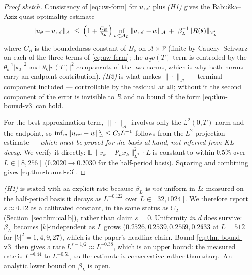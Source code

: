 \begin{proof}[Proof sketch]
Consistency of \eqref{eq:uw-form} for $u_{\rm ref}$ plus \emph{(H1)} gives the
Babu\v{s}ka--Aziz quasi-optimality estimate
\[
  \|u_\theta - u_{\rm ref}\|_{\mathcal{A}}
  \;\le\;
  \Bigl(1 + \tfrac{C_B}{\beta_L}\Bigr)
    \inf_{w \in \mathcal{A}_L} \|u_{\rm ref} - w\|_{\mathcal{A}}
  \;+\; \beta_L^{-1} \|R(\theta)\|_{\mathcal{V}_L'} ,
\]
where $C_B$ is the boundedness constant of $B_k$ on
$\mathcal{A} \times \mathcal{V}$ (finite by Cauchy--Schwarz on each of the three
terms of \eqref{eq:uw-form}; the $a_T v(T)$ term is controlled by the
$\theta_k^{-1}|a_T|^2$ and $\theta_k |v(T)|^2$ components of the two norms, which
is why both norms carry an endpoint contribution). \emph{(H2)} is what makes
$\|\cdot\|_{\mathcal{A}}$ --- terminal component included --- controllable by the
residual at all; without it the second component of the error is invisible to
$R$ and no bound of the form \eqref{eq:thm-bound-v3} can hold.

For the best-approximation term, $\|\cdot\|_{\mathcal{A}}$ involves only the
$L^2(0,T)$ norm and the endpoint, so
$\inf_w \|u_{\rm ref} - w\|_{\mathcal{A}}^2 \le C_2 L^{-1}$ follows from the
$L^2$-projection estimate --- \emph{which must be proved for the basis at hand,
not inferred from KL decay}. We verify it directly:
$\mathbb{E}\|x_k - P_L x_k\|_{L^2}^2 \cdot L$ is constant to within $0.5\%$ over
$L \in [8, 256]$ ($0.2020 \to 0.2030$ for the half-period basis). Squaring and
combining gives \eqref{eq:thm-bound-v3}.
\end{proof}

\begin{remark}
\emph{(H1)} is stated with an explicit rate because $\beta_L$ is \emph{not}
uniform in $L$: measured on the half-period basis it decays as $L^{-0.122}$ over
$L \in [32, 1024]$. We therefore report $s \approx 0.12$ as a calibrated
constant, in the same status as $C_2$ (Section~\ref{sec:thm:calib}), rather than
claim $s = 0$. Uniformity \emph{in $d$} does survive: $\beta_L$ becomes
$|k|$-independent as $L$ grows ($0.2526, 0.2539, 0.2559, 0.2633$ at $L = 512$ for
$|k|^2 = 1, 4, 9, 27$), which is the paper's headline claim.
Bound \eqref{eq:thm-bound-v3} then gives a rate $L^{s - 1/2} \approx L^{-0.38}$,
which is an upper bound: the measured rate is $L^{-0.44}$ to $L^{-0.51}$, so the
estimate is conservative rather than sharp. An analytic lower bound on $\beta_L$
is open.
\end{remark}

